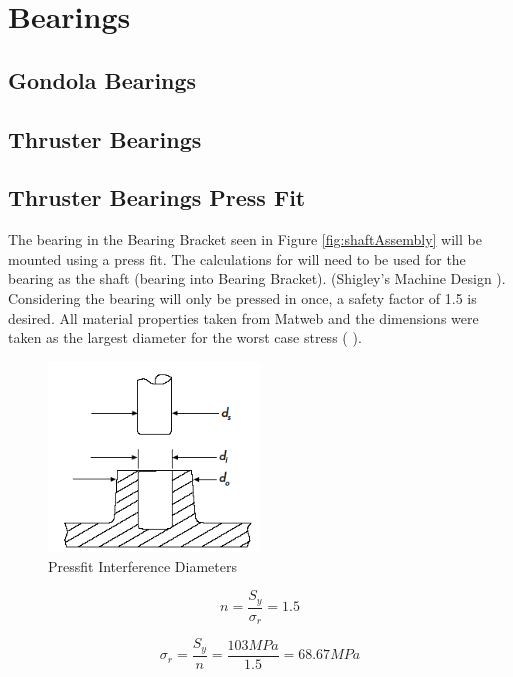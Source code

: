 \documentclass[../main.tex]{subfiles}
\begin{document}
\section{Bearings} \label{Bearings}
\subsection{Gondola Bearings}

\subsection{Thruster Bearings}

\subsection{Thruster Bearings Press Fit}
The bearing in the Bearing Bracket seen in Figure \ref{fig:shaftAssembly} will be mounted using a press fit. The calculations for will need to be used for the bearing as the shaft (bearing into Bearing Bracket). {(Shigley's Machine Design \cite[116]{shigley})}. Considering the bearing will only be pressed in once, a safety factor of 1.5 is desired. All material properties taken from Matweb and the dimensions were taken as the largest diameter for the worst case stress (\cite{316StainlessSteel} \cite{Aluminum6061} \cite{Nylon6}).

\begin{figure}[H]
	\centering
	\includegraphics[width=0.5\textwidth]{img/analysis/thruster/pressfit.png}
	\caption{Pressfit Interference Diameters \cite{pressfit}}
	\label{fig:pressfit}
\end{figure}

\begin{equation}
n=\frac{S_y}{\sigma_r}=1.5
\end{equation}

\begin{equation}
{\sigma_r}=\frac{S_y}{n}=\frac{103MPa}{1.5}=68.67MPa
\end{equation}
\end{document}
